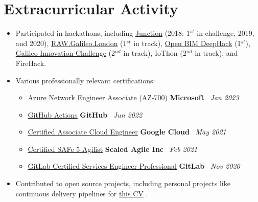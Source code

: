 \documentclass[11pt,a4paper,sans]{moderncv}
\newcommand{\inlineLink}[2]{%
    \underline{\href{#1}{#2}}%
}
\begin{document}
\section{Extracurricular Activity}
{		
	\begin{itemize}[label=\textbullet]
		\item Participated in hackathons, including 
		      \href{https://www.hackjunction.com/}{Junction} (2018: 1$^{st}$ in challenge, 2019, and 2020), 
		      \href{https://raw.galileo.london/}{RAW.Galileo.London} (1$^{st}$ in track), 
		      \href{https://ultrahack.org/open-bim-deephack}{Open BIM DeepHack} (1$^{st}$), 
		      \href{https://ultrahack.org/galileoinnovationchallenge}{Galileo Innovation Challenge} (2$^{nd}$ in track), 
		      IoThon (2$^{nd}$ in track), and 
		      FireHack.
		      		      		          
		\item Various professionally relevant certifications:
		      {
		      	\newcommand{\certificateEntry}[4]{%
		      		\item \inlineLink{#1}{#2} \hfill {\bfseries #3} \ {\itshape #4}%
		      	}
		      			      			      	
		      	\begin{itemize}
		      		\certificateEntry
		      		{https://www.credly.com/badges/f2b4e861-75b4-43cd-8cb5-98835bf5a2d3/public_url}
		      		{Azure Network Engineer Associate (AZ-700)}
		      		{Microsoft}
		      		{Jan 2023}
		      				      				      		        
		      		\certificateEntry
		      		{https://www.credly.com/badges/4d91abb3-5f49-4f22-a0cc-d8d4f6841738/public_url}
		      		{GitHub Actions}
		      		{GitHub}
		      		{Jun 2022}
		      				      				      		        
		      		\certificateEntry
		      		{https://www.credential.net/3e7c1e77-e591-40d3-88ff-67494b422cfc?key=9d07014f6e1465d00a525436cfdb53cc8b7fd70ae353b12ea668dee572d2c797}
		      		{Certified Associate Cloud Engineer}
		      		{Google Cloud}
		      		{May 2021}
		      				      				      		        
		      		\certificateEntry
		      		{https://www.youracclaim.com/badges/deb40f91-a445-4e73-aed5-714988eefd80/}
		      		{Certified SAFe 5 Agilist}
		      		{Scaled Agile Inc}
		      		{Feb 2021}
		      				      				      		        
		      		\certificateEntry
		      		{https://www.credly.com/badges/d9372b90-3057-4429-b61f-e8cd4c2b6615/public_url}
		      		{GitLab Certified Services Engineer Professional}
		      		{GitLab}
		      		{Nov 2020}
		      	\end{itemize}
		      }
		\item Contributed to open source projects, including personal projects like continuous delivery pipelines for \inlineLink{https://github.com/addono/cv}{this CV}.
	\end{itemize}} 
\end{document}
